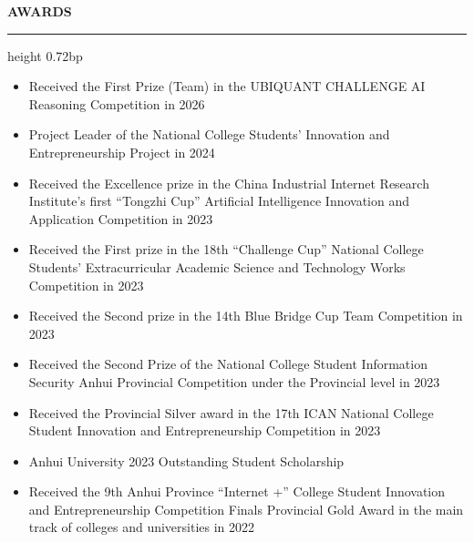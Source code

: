 \documentclass[10pt,a4paper]{article}
\newcommand{\compactsectionrule}[1]{%
  \par\vspace{0.24bp}\noindent\textbf{#1}\par\vspace{2.62bp}%
  \hrule height 0.72bp\vspace{0.66bp}%
}
\newenvironment{cvitems}{%
  \begin{itemize}[leftmargin=14.20bp,labelwidth=4.20bp,labelsep=10.00bp,align=left,
    topsep=0bp,itemsep=0bp,parsep=0bp,partopsep=0bp,label={\textbullet}]
}{\end{itemize}}
\begin{document}
\compactsectionrule{AWARDS}
\begin{cvitems}
\item Received the First Prize (Team) in the UBIQUANT CHALLENGE AI Reasoning Competition in 2026
\item Project Leader of the National College Students' Innovation and Entrepreneurship Project in 2024
\item Received the Excellence prize in the China Industrial Internet Research Institute's first ``Tongzhi Cup'' Artificial Intelligence Innovation and Application Competition in 2023
\item Received the First prize in the 18th ``Challenge Cup'' National College Students' Extracurricular Academic Science and Technology Works Competition in 2023
\item Received the Second prize in the 14th Blue Bridge Cup Team Competition in 2023
\item Received the Second Prize of the National College Student Information Security Anhui Provincial Competition under the Provincial level in 2023
\item Received the Provincial Silver award in the 17th ICAN National College Student Innovation and Entrepreneurship Competition in 2023
\item Anhui University 2023 Outstanding Student Scholarship
\item Received the 9th Anhui Province ``Internet +'' College Student Innovation and Entrepreneurship Competition Finals Provincial Gold Award in the main track of colleges and universities in 2022
\end{cvitems}
\end{document}
